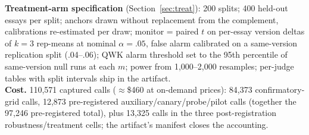 \documentclass[fleqn,10pt]{JLA_article}
\begin{document}
\textbf{Treatment-arm specification} (Section~\ref{sec:treat}): 200 splits; 400 held-out essays per split; anchors drawn without replacement from the complement, calibrations re-estimated per draw; monitor = paired $t$ on per-essay version deltas of $k{=}3$ rep-means at nominal $\alpha{=}.05$, false alarm calibrated on a same-version replication split (.04--.06); QWK alarm threshold set to the 95th percentile of same-version null runs at each $m$; power from 1,000--2,000 resamples; per-judge tables with split intervals ship in the artifact.\\[4pt]
\textbf{Cost.} 110{,}571 captured calls ($\approx$\$460 at on-demand prices): 84{,}373 confirmatory-grid calls, 12{,}873 pre-registered auxiliary/canary/probe/pilot calls (together the 97{,}246 pre-registered total), plus 13{,}325 calls in the three post-registration robustness/treatment cells; the artifact's manifest closes the accounting.
\end{document}
